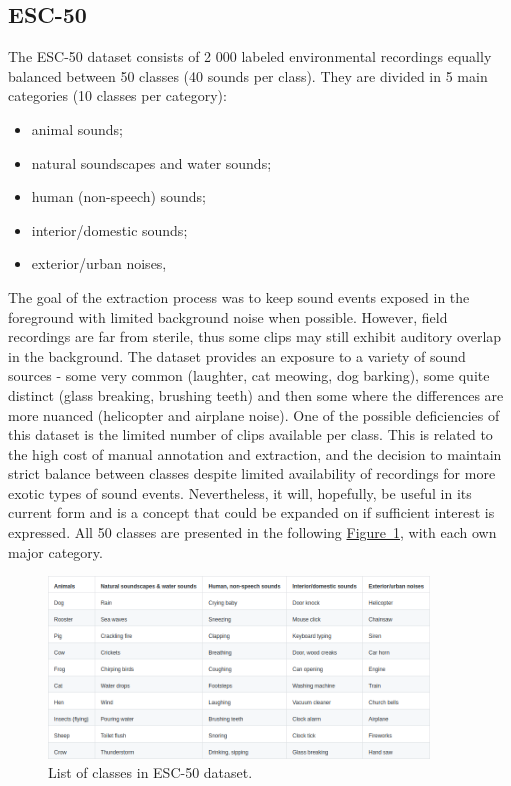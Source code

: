 \documentclass[english, LaM, oneside]{sapthesis}%
\begin{document}
\subsection{ESC-50}
The ESC-50 dataset consists of 2 000 labeled environmental recordings equally balanced between 50 classes (40 sounds per class). They are divided in 5 main categories (10 classes per category):
\begin{itemize}
    \item animal sounds;
    \item natural soundscapes and water sounds;
    \item human (non-speech) sounds;
    \item interior/domestic sounds;
    \item exterior/urban noises,
\end{itemize}
The goal of the extraction process was to keep sound events exposed in the foreground with limited background noise when possible. However, field recordings are far from sterile, thus some clips may still exhibit auditory overlap in the background.
The dataset provides an exposure to a variety of sound sources - some very common (laughter, cat meowing, dog barking), some quite distinct (glass breaking, brushing teeth) and then some where the differences are more nuanced (helicopter and airplane noise).
One of the possible deficiencies of this dataset is the limited number of clips available per class. This is related to the high cost of manual annotation and extraction, and the decision to maintain strict balance between classes despite limited availability of recordings for more exotic types of sound events. Nevertheless, it will, hopefully, be useful in its current form and is a concept that could be expanded on if sufficient interest is expressed.
\newline \newline
All 50 classes are presented in the following \hyperref[fig:escclasses]{Figure~\ref*{fig:escclasses}}, with each own major category.
\begin{figure}[h]
            \centering
            \includegraphics[width=0.90\textwidth]{esc50.png}
            \caption{List of classes in ESC-50 dataset.}
            \label{fig:escclasses}
\end{figure}
\end{document}
